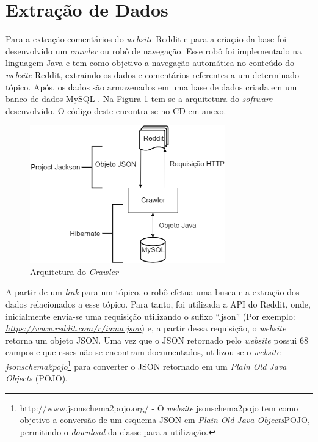 \section{Extração de Dados}
\label{cap:Extracao}

Para a extração comentários do \textit{website} Reddit e para a criação da base
foi desenvolvido um \textit{crawler} ou robô de navegação. Esse robô foi
implementado na linguagem Java e tem como objetivo a navegação automática no
conteúdo do \textit{website} Reddit, extraindo os dados e comentários referentes a um
determinado tópico. Após, os dados são armazenados em uma base de dados criada
em um banco de dados MySQL \cite{Widenius:2002:MRM:560480}.
Na Figura \ref{fig:crawler} tem-se a arquitetura do \textit{software}
desenvolvido. O código deste encontra-se no CD em anexo.

\begin{figure}[htbp]
\centering
\includegraphics[height=225px]{imagens/arquitetura.png}
\caption{Arquitetura do \textit{Crawler}}
\label{fig:crawler}
\end{figure}

A partir de um \textit{link} para um tópico, o robô efetua uma busca e a
extração dos dados relacionados a esse tópico. Para tanto, foi utilizada a
\ac{API} do Reddit, onde, inicialmente envia-se uma requisição utilizando o
sufixo ``.json'' (Por exemplo:
\textit{\url{https://www.reddit.com/r/iama.json}}) e, a partir dessa requisição,
o \textit{website} retorna um objeto \ac{JSON}. Uma vez que o \ac{JSON}
retornado pelo \textit{website} possui 68 campos e que esses não se encontram
documentados, utilizou-se o \textit{website}
\textit{jsonschema2pojo}\footnote{http://www.jsonschema2pojo.org/ - O
\textit{website} jsonschema2pojo tem como objetivo a conversão de um esquema \ac{JSON} em
\textit{Plain Old Java Objects}\ac{POJO}, permitindo o \textit{download} da classe para a utilização.} para converter o
JSON retornado em um \textit{Plain Old Java Objects} (\ac{POJO}).

